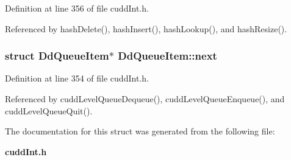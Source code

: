 Definition at line 356 of file cudd\-Int.h.

Referenced by hash\-Delete(), hash\-Insert(), hash\-Lookup(), and hash\-Resize().
\subsubsection{\setlength{\rightskip}{0pt plus 5cm}struct \bf{Dd\-Queue\-Item}$\ast$ \bf{Dd\-Queue\-Item::next}}\label{structDdQueueItem_0d21b7869d18ec60019c1bffaacf0a16}




Definition at line 354 of file cudd\-Int.h.

Referenced by cudd\-Level\-Queue\-Dequeue(), cudd\-Level\-Queue\-Enqueue(), and cudd\-Level\-Queue\-Quit().

The documentation for this struct was generated from the following file:\begin{CompactItemize}
\item 
\bf{cudd\-Int.h}\end{CompactItemize}
